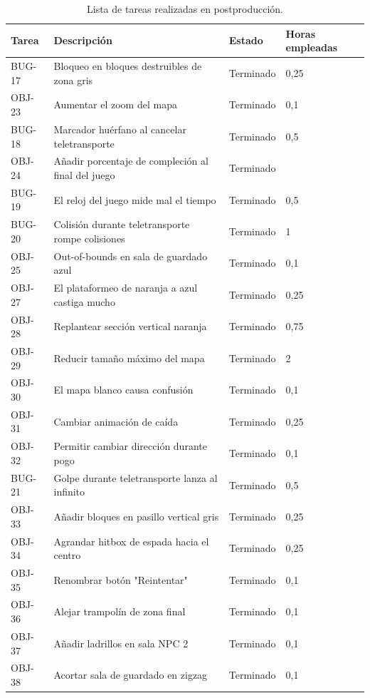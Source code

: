 \begin{table}[hbt]
    \centering
    \begin{tabular}{|l|p{6cm}|l|p{2cm}|}
    \hline
    \textbf{Tarea} & \textbf{Descripción} & \textbf{Estado} & \textbf{Horas empleadas} \\ \hline
    BUG-17 & Bloqueo en bloques destruibles de zona gris & Terminado & 0,25 \\ \hline
    OBJ-23 & Aumentar el zoom del mapa & Terminado & 0,1 \\ \hline
    BUG-18 & Marcador huérfano al cancelar teletransporte & Terminado & 0,5 \\ \hline
    OBJ-24 & Añadir porcentaje de compleción al final del juego & Terminado & ~ \\ \hline
    BUG-19 & El reloj del juego mide mal el tiempo & Terminado & 0,5 \\ \hline
    BUG-20 & Colisión durante teletransporte rompe colisiones & Terminado & 1 \\ \hline
    OBJ-25 & Out-of-bounds en sala de guardado azul & Terminado & 0,1 \\ \hline
    OBJ-27 & El plataformeo de naranja a azul castiga mucho & Terminado & 0,25 \\ \hline
    OBJ-28 & Replantear sección vertical naranja & Terminado & 0,75 \\ \hline
    OBJ-29 & Reducir tamaño máximo del mapa & Terminado & 2 \\ \hline
    OBJ-30 & El mapa blanco causa confusión & Terminado & 0,1 \\ \hline
    OBJ-31 & Cambiar animación de caída & Terminado & 0,25 \\ \hline
    OBJ-32 & Permitir cambiar dirección durante pogo & Terminado & 0,1 \\ \hline
    BUG-21 & Golpe durante teletransporte lanza al infinito & Terminado & 0,5 \\ \hline
    OBJ-33 & Añadir bloques en pasillo vertical gris & Terminado & 0,25 \\ \hline
    OBJ-34 & Agrandar hitbox de espada hacia el centro & Terminado & 0,25 \\ \hline
    OBJ-35 & Renombrar botón "Reintentar" & Terminado & 0,1 \\ \hline
    OBJ-36 & Alejar trampolín de zona final & Terminado & 0,1 \\ \hline
    OBJ-37 & Añadir ladrillos en sala NPC 2 & Terminado & 0,1 \\ \hline
    OBJ-38 & Acortar sala de guardado en zigzag & Terminado & 0,1 \\ \hline
    \end{tabular}
    \caption{Lista de tareas realizadas en postproducción.}
    \label{tab:postpro2}
\end{table}


